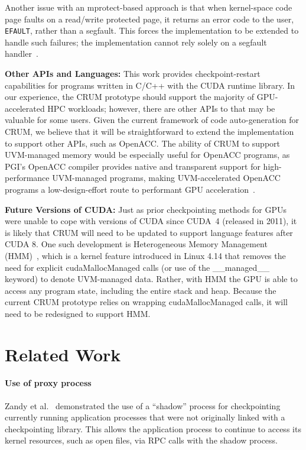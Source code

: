 \documentclass[11pt]{article}
\begin{document}
Another issue with an mprotect-based approach is that when kernel-space
code page faults on a read/write protected page, it returns an error code
to the user, {\tt EFAULT}, rather than a segfault. This forces the implementation
to be extended to handle such failures; the implementation cannot rely solely
on a segfault handler~\cite{plank1994libckpt,ruscio2007dejavu,bugnion2013lightweight,vogt2015lightweight}.

{\bf Other APIs and Languages:} This work provides checkpoint-restart
capabilities for programs written in C/C++ with the CUDA runtime library.  In
our experience, the CRUM prototype should support the majority of
GPU-accelerated HPC workloads; however, there are other APIs to that may be
valuable for some users. Given the current framework of code auto-generation for
CRUM, we believe that it will be straightforward to extend the implementation to support
other APIs, such as OpenACC.  The ability of CRUM to support UVM-managed memory
would be especially useful for OpenACC programs, as PGI's OpenACC compiler
provides native and transparent support for high-performance UVM-managed
programs, making UVM-accelerated OpenACC programs a low-design-effort route to
performant GPU acceleration~\cite{sakharnykh_openacc_2015}.



{\bf Future Versions of CUDA:} Just as prior checkpointing methods for GPUs
were unable to cope with versions of CUDA since CUDA~4 (released in 2011), it
is likely that CRUM will need to be updated to support language features after
CUDA 8. One such development is Heterogeneous Memory Management
(HMM)~\cite{hubbard_hmm_2017}, which is a kernel feature introduced in Linux
4.14 that removes the need for explicit cudaMallocManaged calls (or use of the
\_\_managed\_\_ keyword) to denote UVM-managed data. Rather, with HMM the GPU
is able to access any program state, including the entire stack and heap.
Because the current CRUM prototype relies on wrapping cudaMallocManaged calls,
it will need to be redesigned to support HMM.

\section{Related Work}
\label{sec:relatedWork}

\paragraph{Use of proxy process} Zandy et al.~\cite{zandy1999process}
demonstrated the use of a ``shadow'' process for checkpointing currently
running application processes that were not originally linked with a
checkpointing library. This allows the application process to continue to
access its kernel resources, such as open files, via RPC calls with the
shadow process.
\end{document}
